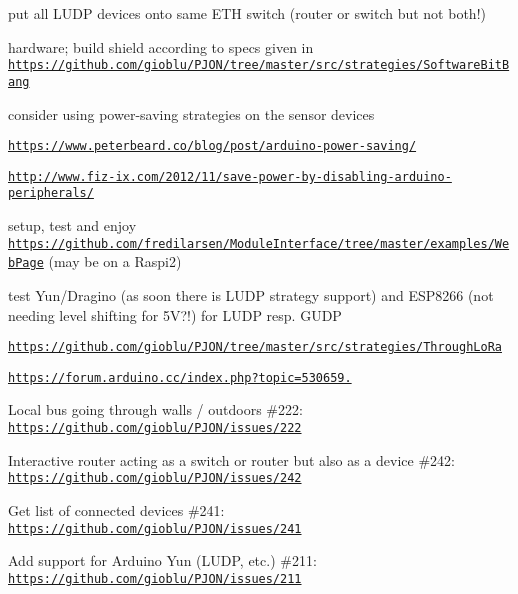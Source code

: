 \begin{DoxyItemize}
\begin{DoxyItemize}
\begin{DoxyItemize}
\begin{DoxyItemize}
\item put all L\-U\-D\-P devices onto same E\-T\-H switch (router or switch but not both!)
\end{DoxyItemize}
\end{DoxyItemize}
\item hardware; build shield according to specs given in \href{https://github.com/gioblu/PJON/tree/master/src/strategies/SoftwareBitBang}{\tt https\-://github.\-com/gioblu/\-P\-J\-O\-N/tree/master/src/strategies/\-Software\-Bit\-Bang}
\item consider using power-\/saving strategies on the sensor devices
\begin{DoxyItemize}
\item \href{https://www.peterbeard.co/blog/post/arduino-power-saving/}{\tt https\-://www.\-peterbeard.\-co/blog/post/arduino-\/power-\/saving/}
\item \href{http://www.fiz-ix.com/2012/11/save-power-by-disabling-arduino-peripherals/}{\tt http\-://www.\-fiz-\/ix.\-com/2012/11/save-\/power-\/by-\/disabling-\/arduino-\/peripherals/}
\end{DoxyItemize}
\item setup, test and enjoy \href{https://github.com/fredilarsen/ModuleInterface/tree/master/examples/WebPage}{\tt https\-://github.\-com/fredilarsen/\-Module\-Interface/tree/master/examples/\-Web\-Page} (may be on a Raspi2)
\item test Yun/\-Dragino (as soon there is L\-U\-D\-P strategy support) and E\-S\-P8266 (not needing level shifting for 5\-V?!) for L\-U\-D\-P resp. G\-U\-D\-P
\begin{DoxyItemize}
\item \href{https://github.com/gioblu/PJON/tree/master/src/strategies/ThroughLoRa}{\tt https\-://github.\-com/gioblu/\-P\-J\-O\-N/tree/master/src/strategies/\-Through\-Lo\-Ra}
\item \href{https://forum.arduino.cc/index.php?topic=530659.0}{\tt https\-://forum.\-arduino.\-cc/index.\-php?topic=530659.}
\end{DoxyItemize}
\item Local bus going through walls / outdoors \#222\-: \href{https://github.com/gioblu/PJON/issues/222}{\tt https\-://github.\-com/gioblu/\-P\-J\-O\-N/issues/222}
\item Interactive router acting as a switch or router but also as a device \#242\-: \href{https://github.com/gioblu/PJON/issues/242}{\tt https\-://github.\-com/gioblu/\-P\-J\-O\-N/issues/242}
\item Get list of connected devices \#241\-: \href{https://github.com/gioblu/PJON/issues/241}{\tt https\-://github.\-com/gioblu/\-P\-J\-O\-N/issues/241}
\item Add support for Arduino Yun (L\-U\-D\-P, etc.) \#211\-: \href{https://github.com/gioblu/PJON/issues/211}{\tt https\-://github.\-com/gioblu/\-P\-J\-O\-N/issues/211}
\end{DoxyItemize}
\end{DoxyItemize}

